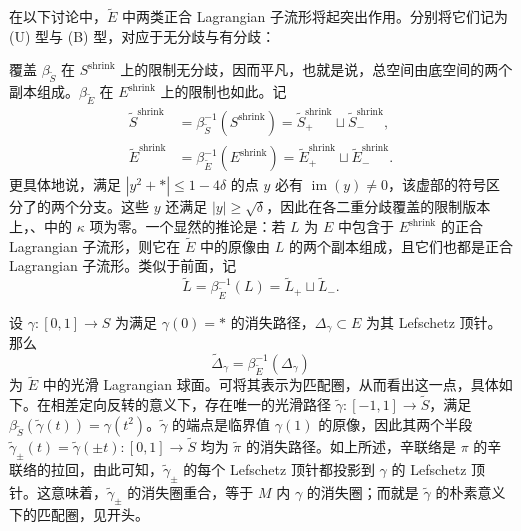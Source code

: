 在以下讨论中，$\widetilde E$ 中两类正合 Lagrangian 子流形将起突出作用。分别将它们记为 (U) 型与 (B) 型，对应于无分歧与有分歧：
\begin{definition*}[(U) 型]
覆盖 $\beta_{\widetilde S}$ 在 $S^{\mathrm{shrink}}$ 上的限制无分歧，因而平凡，也就是说，总空间由底空间的两个副本组成。$\beta_{\widetilde E}$ 在 $E^{\mathrm{shrink}}$ 上的限制也如此。记
\begin{equation}\label{eq:18.4}
\begin{aligned}
\widetilde S^{\mathrm{shrink}}&=\beta_{\widetilde S}^{-1}(S^{\mathrm{shrink}})=\widetilde S^{\mathrm{shrink}}_+\sqcup\widetilde S^{\mathrm{shrink}}_-,\\
\widetilde E^{\mathrm{shrink}}&=\beta_{\widetilde E}^{-1}(E^{\mathrm{shrink}})=\widetilde E^{\mathrm{shrink}}_+\sqcup\widetilde E^{\mathrm{shrink}}_-.
\end{aligned}
\end{equation}
更具体地说，满足 $|y^2+*|\le1-4\delta$ 的点 $y$ 必有 $\operatorname{im}(y)\ne0$，该虚部的符号区分了的两个分支。这些 $y$ 还满足 $|y|\ge\sqrt\delta$，因此在各二重分歧覆盖的限制版本上，、中的 $\kappa$ 项为零。一个显然的推论是：若 $L$ 为 $E$ 中包含于 $E^{\mathrm{shrink}}$ 的正合 Lagrangian 子流形，则它在 $\widetilde E$ 中的原像由 $L$ 的两个副本组成，且它们也都是正合 Lagrangian 子流形。类似于前面，记
\[
\widetilde L=\beta_{\widetilde E}^{-1}(L)=\widetilde L_+\sqcup\widetilde L_-.
\]
\end{definition*}
\begin{definition*}[(B) 型]
设 $\gamma:[0,1]\to S$ 为满足 $\gamma(0)=*$ 的消失路径，$\Delta_\gamma\subset E$ 为其 Lefschetz 顶针。那么
\begin{equation}\label{eq:18.5}
\widetilde\Delta_\gamma=\beta_{\widetilde E}^{-1}(\Delta_\gamma)
\end{equation}
为 $\widetilde E$ 中的光滑 Lagrangian 球面。可将其表示为匹配圈，从而看出这一点，具体如下。在相差定向反转的意义下，存在唯一的光滑路径 $\widetilde\gamma:[-1,1]\to\widetilde S$，满足 $\beta_{\widetilde S}(\widetilde\gamma(t))=\gamma(t^2)$。$\widetilde\gamma$ 的端点是临界值 $\gamma(1)$ 的原像，因此其两个半段 $\widetilde\gamma_\pm(t)=\widetilde\gamma(\pm t):[0,1]\to\widetilde S$ 均为 $\widetilde\pi$ 的消失路径。如上所述，辛联络是 $\pi$ 的辛联络的拉回，由此可知，$\widetilde\gamma_\pm$ 的每个 Lefschetz 顶针都投影到 $\gamma$ 的 Lefschetz 顶针。这意味着，$\widetilde\gamma_\pm$ 的消失圈重合，等于 $M$ 内 $\gamma$ 的消失圈；而就是 $\widetilde\gamma$ 的朴素意义下的匹配圈，见开头。
\end{definition*}
